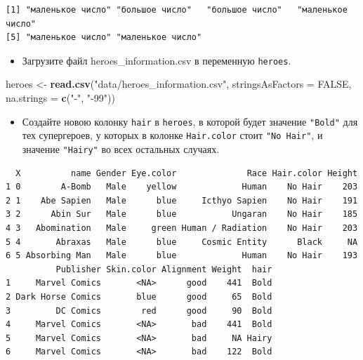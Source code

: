 \documentclass[
]{book}
\newenvironment{Shaded}{\begin{snugshade}}{\end{snugshade}}
\newcommand{\DataTypeTok}[1]{\textcolor[rgb]{0.13,0.29,0.53}{#1}}
\newcommand{\KeywordTok}[1]{\textcolor[rgb]{0.13,0.29,0.53}{\textbf{#1}}}
\newcommand{\NormalTok}[1]{#1}
\newcommand{\OperatorTok}[1]{\textcolor[rgb]{0.81,0.36,0.00}{\textbf{#1}}}
\newcommand{\OtherTok}[1]{\textcolor[rgb]{0.56,0.35,0.01}{#1}}
\newcommand{\StringTok}[1]{\textcolor[rgb]{0.31,0.60,0.02}{#1}}
\providecommand{\tightlist}{%
  \setlength{\itemsep}{0pt}\setlength{\parskip}{0pt}}
\begin{document}
\begin{verbatim}
[1] "маленькое число" "большое число"   "большое число"   "маленькое число"
[5] "маленькое число" "маленькое число"
\end{verbatim}

\begin{itemize}
\tightlist
\item
  Загрузите файл heroes\_information.csv в переменную \texttt{heroes}.
\end{itemize}

\begin{Shaded}
\begin{Highlighting}[]
\NormalTok{heroes <-}\StringTok{ }\KeywordTok{read.csv}\NormalTok{(}\StringTok{"data/heroes_information.csv"}\NormalTok{, }
                   \DataTypeTok{stringsAsFactors =} \OtherTok{FALSE}\NormalTok{,}
                   \DataTypeTok{na.strings =} \KeywordTok{c}\NormalTok{(}\StringTok{"-"}\NormalTok{, }\StringTok{"-99"}\NormalTok{))}
\end{Highlighting}
\end{Shaded}

\begin{itemize}
\tightlist
\item
  Создайте новою колонку \texttt{hair} в \texttt{heroes}, в которой будет значение \texttt{"Bold"} для тех супергероев, у которых в колонке \texttt{Hair.color} стоит \texttt{"No\ Hair"}, и значение \texttt{"Hairy"} во всех остальных случаях.
\end{itemize}

\begin{Shaded}
\end{Shaded}

\begin{verbatim}
  X          name Gender Eye.color              Race Hair.color Height
1 0        A-Bomb   Male    yellow             Human    No Hair    203
2 1    Abe Sapien   Male      blue     Icthyo Sapien    No Hair    191
3 2      Abin Sur   Male      blue           Ungaran    No Hair    185
4 3   Abomination   Male     green Human / Radiation    No Hair    203
5 4       Abraxas   Male      blue     Cosmic Entity      Black     NA
6 5 Absorbing Man   Male      blue             Human    No Hair    193
          Publisher Skin.color Alignment Weight  hair
1     Marvel Comics       <NA>      good    441  Bold
2 Dark Horse Comics       blue      good     65  Bold
3         DC Comics        red      good     90  Bold
4     Marvel Comics       <NA>       bad    441  Bold
5     Marvel Comics       <NA>       bad     NA Hairy
6     Marvel Comics       <NA>       bad    122  Bold
\end{verbatim}
\end{document}
